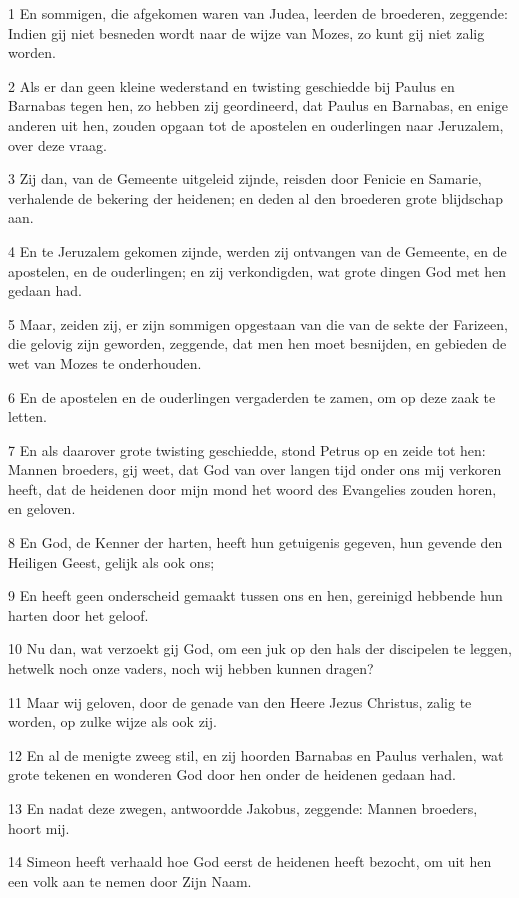 \par 1 En sommigen, die afgekomen waren van Judea, leerden de broederen, zeggende: Indien gij niet besneden wordt naar de wijze van Mozes, zo kunt gij niet zalig worden.
\par 2 Als er dan geen kleine wederstand en twisting geschiedde bij Paulus en Barnabas tegen hen, zo hebben zij geordineerd, dat Paulus en Barnabas, en enige anderen uit hen, zouden opgaan tot de apostelen en ouderlingen naar Jeruzalem, over deze vraag.
\par 3 Zij dan, van de Gemeente uitgeleid zijnde, reisden door Fenicie en Samarie, verhalende de bekering der heidenen; en deden al den broederen grote blijdschap aan.
\par 4 En te Jeruzalem gekomen zijnde, werden zij ontvangen van de Gemeente, en de apostelen, en de ouderlingen; en zij verkondigden, wat grote dingen God met hen gedaan had.
\par 5 Maar, zeiden zij, er zijn sommigen opgestaan van die van de sekte der Farizeen, die gelovig zijn geworden, zeggende, dat men hen moet besnijden, en gebieden de wet van Mozes te onderhouden.
\par 6 En de apostelen en de ouderlingen vergaderden te zamen, om op deze zaak te letten.
\par 7 En als daarover grote twisting geschiedde, stond Petrus op en zeide tot hen: Mannen broeders, gij weet, dat God van over langen tijd onder ons mij verkoren heeft, dat de heidenen door mijn mond het woord des Evangelies zouden horen, en geloven.
\par 8 En God, de Kenner der harten, heeft hun getuigenis gegeven, hun gevende den Heiligen Geest, gelijk als ook ons;
\par 9 En heeft geen onderscheid gemaakt tussen ons en hen, gereinigd hebbende hun harten door het geloof.
\par 10 Nu dan, wat verzoekt gij God, om een juk op den hals der discipelen te leggen, hetwelk noch onze vaders, noch wij hebben kunnen dragen?
\par 11 Maar wij geloven, door de genade van den Heere Jezus Christus, zalig te worden, op zulke wijze als ook zij.
\par 12 En al de menigte zweeg stil, en zij hoorden Barnabas en Paulus verhalen, wat grote tekenen en wonderen God door hen onder de heidenen gedaan had.
\par 13 En nadat deze zwegen, antwoordde Jakobus, zeggende: Mannen broeders, hoort mij.
\par 14 Simeon heeft verhaald hoe God eerst de heidenen heeft bezocht, om uit hen een volk aan te nemen door Zijn Naam.
